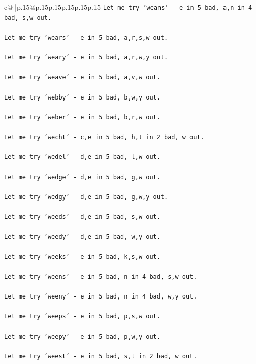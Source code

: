 \documentclass{article}
\begin{document}
{\begin{supertabular}{c@{$\;$}|p{.15\linewidth}@{}p{.15\linewidth}p{.15\linewidth}p{.15\linewidth}p{.15\linewidth}p{.15\linewidth}}
{{{\texttt{Let me try 'weans' {-} e in 5 bad, a,n in 4 bad, s,w out. } \\
\\ 
\texttt{Let me try 'wears' {-} e in 5 bad, a,r,s,w out. } \\
\\ 
\texttt{Let me try 'weary' {-} e in 5 bad, a,r,w,y out. } \\
\\ 
\texttt{Let me try 'weave' {-} e in 5 bad, a,v,w out. } \\
\\ 
\texttt{Let me try 'webby' {-} e in 5 bad, b,w,y out. } \\
\\ 
\texttt{Let me try 'weber' {-} e in 5 bad, b,r,w out. } \\
\\ 
\texttt{Let me try 'wecht' {-} c,e in 5 bad, h,t in 2 bad, w out. } \\
\\ 
\texttt{Let me try 'wedel' {-} d,e in 5 bad, l,w out. } \\
\\ 
\texttt{Let me try 'wedge' {-} d,e in 5 bad, g,w out. } \\
\\ 
\texttt{Let me try 'wedgy' {-} d,e in 5 bad, g,w,y out. } \\
\\ 
\texttt{Let me try 'weeds' {-} d,e in 5 bad, s,w out. } \\
\\ 
\texttt{Let me try 'weedy' {-} d,e in 5 bad, w,y out. } \\
\\ 
\texttt{Let me try 'weeks' {-} e in 5 bad, k,s,w out. } \\
\\ 
\texttt{Let me try 'weens' {-} e in 5 bad, n in 4 bad, s,w out. } \\
\\ 
\texttt{Let me try 'weeny' {-} e in 5 bad, n in 4 bad, w,y out. } \\
\\ 
\texttt{Let me try 'weeps' {-} e in 5 bad, p,s,w out. } \\
\\ 
\texttt{Let me try 'weepy' {-} e in 5 bad, p,w,y out. } \\
\\ 
\texttt{Let me try 'weest' {-} e in 5 bad, s,t in 2 bad, w out. } \\
\\ 
}}}
\end{supertabular}}
\end{document}
